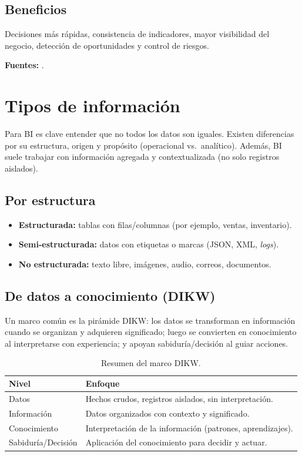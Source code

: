 \documentclass[12pt]{article}
\begin{document}
\subsection*{Beneficios}
Decisiones más rápidas, consistencia de indicadores, mayor visibilidad del negocio, detección de oportunidades y control de riesgos.

\noindent\textbf{Fuentes:} \cite{gartner_abi, ibm_bi, oracle_bi}.

\section{Tipos de información}
Para BI es clave entender que no todos los datos son iguales. Existen diferencias por su estructura, origen y propósito (operacional vs.\ analítico). Además, BI suele trabajar con información agregada y contextualizada (no solo registros aislados).

\subsection*{Por estructura}
\begin{itemize}[leftmargin=*, itemsep=0.25em]
  \item \textbf{Estructurada:} tablas con filas/columnas (por ejemplo, ventas, inventario).
  \item \textbf{Semi-estructurada:} datos con etiquetas o marcas (JSON, XML, \textit{logs}).
  \item \textbf{No estructurada:} texto libre, imágenes, audio, correos, documentos.
\end{itemize}

\subsection*{De datos a conocimiento (DIKW)}
Un marco común es la pirámide DIKW: los datos se transforman en información cuando se organizan y adquieren significado; luego se convierten en conocimiento al interpretarse con experiencia; y apoyan sabiduría/decisión al guiar acciones.

\begin{table}[h!]
\centering
\begin{tabular}{@{}p{3cm}p{10cm}@{}}
\toprule
\textbf{Nivel} & \textbf{Enfoque} \\
\midrule
Datos & Hechos crudos, registros aislados, sin interpretación. \\
Información & Datos organizados con contexto y significado. \\
Conocimiento & Interpretación de la información (patrones, aprendizajes). \\
Sabiduría/Decisión & Aplicación del conocimiento para decidir y actuar. \\
\bottomrule
\end{tabular}
\caption{Resumen del marco DIKW.}
\end{table}
\end{document}
